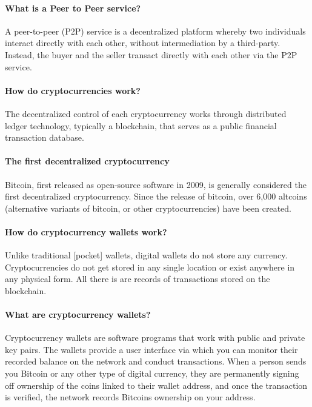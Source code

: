 \paragraph{What is a Peer to Peer service?} A peer-to-peer (P2P) service is a decentralized platform whereby two individuals interact directly with each other, without intermediation by a third-party. Instead, the buyer and the seller transact directly with each other via the P2P service. 

\paragraph{How do cryptocurrencies work?}
The decentralized control of each cryptocurrency works through distributed ledger technology, typically a blockchain, that serves as a public financial transaction database.

\paragraph{The first decentralized cryptocurrency}
Bitcoin, first released as open-source software in 2009, is generally considered the first decentralized cryptocurrency. Since the release of bitcoin, over 6,000 altcoins (alternative variants of bitcoin, or other cryptocurrencies) have been created.


\paragraph{How do cryptocurrency wallets work?}
Unlike traditional [pocket] wallets, digital wallets do not store any currency. Cryptocurrencies do not get stored in any single location or exist anywhere in any physical form. All there is are records of transactions stored on the blockchain.

\paragraph{What are cryptocurrency wallets?}
Cryptocurrency wallets are software programs that work with public and private key pairs. The wallets provide a user interface via which you can monitor their recorded balance on the network and conduct transactions. When a person sends you Bitcoin or any other type of digital currency, they are permanently signing off ownership of the coins linked to their wallet address, and once the transaction is verified, the network records Bitcoins ownership on your address.


